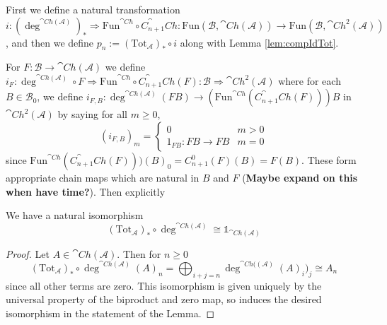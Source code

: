 \begin{rmk}[label=defn:littlepN]
    First we define a natural transformation $i:(\deg^{\cat{Ch}(\mathcal{A})})_*\Rightarrow \text{Fun}^{\cat{Ch}}\circ C_{n+1}^\cat{Ch}:\text{Fun}(\mathcal{B},\cat{Ch}(\mathcal{A}))\rightarrow \text{Fun}(\mathcal{B},\cat{Ch}^2(\mathcal{A}))$, and then we define $p_n := (\text{Tot}_\mathcal{A})_*\circ i$ along with Lemma \ref{lem:compIdTot}. 


    For $F:\mathcal{B}\rightarrow \cat{Ch}(\mathcal{A})$ we define $i_F:\deg^{\cat{Ch}(\mathcal{A})}\circ F\Rightarrow \text{Fun}^{\cat{Ch}}\circ C_{n+1}^\cat{Ch}(F):\mathcal{B}\Rightarrow \cat{Ch}^2(\mathcal{A})$ where for each $B \in \mathcal{B}_0$, we define $i_{F,B}:\deg^{\cat{Ch}(\mathcal{A})}(FB)\rightarrow (\text{Fun}^{\cat{Ch}}(C_{n+1}^\cat{Ch}(F)))B$ in $\cat{Ch}^2(\mathcal{A})$ by saying for all $m \geq 0$,
    \begin{equation*}
        (i_{F,B})_m = \left\{\begin{array}{cc} 0 & m > 0 \\
        1_{FB}:FB\rightarrow FB & m = 0 \end{array}\right.
    \end{equation*}
    since $\text{Fun}^{\cat{Ch}}(C_{n+1}^\cat{Ch}(F)))(B)_0 = C_{n+1}^0(F)(B) = F(B)$. These form appropriate chain maps which are natural in $B$ and $F$ (\textbf{Maybe expand on this when have time?}). Then explicitly
\end{rmk}


\begin{lem}[label=lem:compIdTot]
    We have a natural isomorphism
    \begin{equation*}
        (\text{Tot}_\mathcal{A})_*\circ \deg^{\cat{Ch}(\mathcal{A})} \cong \mathbb{1}_{\cat{Ch}(\mathcal{A})}
    \end{equation*}
\end{lem}
\begin{proof}
    Let $A \in \cat{Ch}(\mathcal{A})$. Then for $n \geq 0$
    \begin{equation*}
        (\text{Tot}_\mathcal{A})_*\circ \deg^{\cat{Ch}(\mathcal{A})}(A)_n = \bigoplus_{i+j=n}\deg^{\cat{Ch}((\mathcal{A})}(A)_i)_j \cong A_n
    \end{equation*}
    since all other terms are zero. This isomorphism is given uniquely by the universal property of the biproduct and zero map, so induces the desired isomorphism in the statement of the Lemma.
\end{proof}

